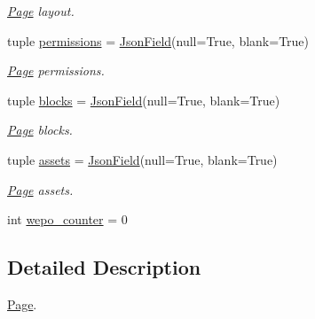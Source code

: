 \begin{DoxyCompactItemize}
\begin{DoxyCompactList}\small\item\em \hyperlink{classcore_1_1models_1_1Page}{Page} layout. \end{DoxyCompactList}\item 
tuple \hyperlink{classcore_1_1models_1_1Page_ac8581869cbe320c85b6be487430d23ef}{permissions} = \hyperlink{classcore_1_1fields_1_1JsonField}{Json\-Field}(null=True, blank=True)
\begin{DoxyCompactList}\small\item\em \hyperlink{classcore_1_1models_1_1Page}{Page} permissions. \end{DoxyCompactList}\item 
tuple \hyperlink{classcore_1_1models_1_1Page_a8929e212abf0bd54841eff713c431039}{blocks} = \hyperlink{classcore_1_1fields_1_1JsonField}{Json\-Field}(null=True, blank=True)
\begin{DoxyCompactList}\small\item\em \hyperlink{classcore_1_1models_1_1Page}{Page} blocks. \end{DoxyCompactList}\item 
tuple \hyperlink{classcore_1_1models_1_1Page_a2be141ff9260f87470c61991ef24d924}{assets} = \hyperlink{classcore_1_1fields_1_1JsonField}{Json\-Field}(null=True, blank=True)
\begin{DoxyCompactList}\small\item\em \hyperlink{classcore_1_1models_1_1Page}{Page} assets. \end{DoxyCompactList}\item 
int \hyperlink{classcore_1_1models_1_1Page_ad187b76ce6d3fa0e61f125da2536744e}{wepo\-\_\-counter} = 0
\end{DoxyCompactItemize}


\subsection{Detailed Description}
\hyperlink{classcore_1_1models_1_1Page}{Page}. 

